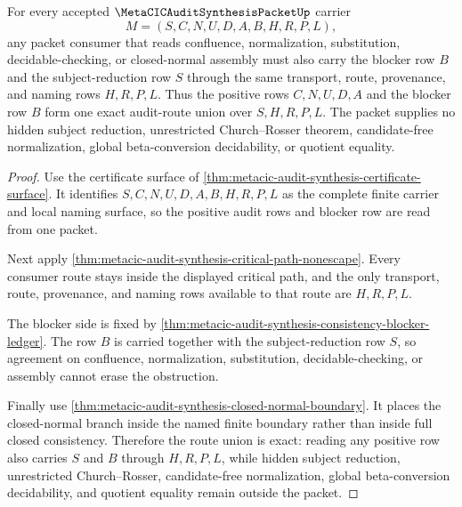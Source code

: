 \begin{theorem}
\label{thm:metacic-audit-synthesis-route-union-exactness}
For every accepted $\MetaCICAuditSynthesisPacketUp$ carrier
$$
M=(S,C,N,U,D,A,B,H,R,P,L),
$$
any packet consumer that reads confluence, normalization, substitution, decidable-checking, or closed-normal assembly must also carry the blocker row $B$ and the subject-reduction row $S$ through the same transport, route, provenance, and naming rows $H,R,P,L$. Thus the positive rows $C,N,U,D,A$ and the blocker row $B$ form one exact audit-route union over $S,H,R,P,L$. The packet supplies no hidden subject reduction, unrestricted Church--Rosser theorem, candidate-free normalization, global beta-conversion decidability, or quotient equality.
\end{theorem}
\begin{proof}
Use the certificate surface of \autoref{thm:metacic-audit-synthesis-certificate-surface}. It identifies $S,C,N,U,D,A,B,H,R,P,L$ as the complete finite carrier and local naming surface, so the positive audit rows and blocker row are read from one packet.

Next apply \autoref{thm:metacic-audit-synthesis-critical-path-nonescape}. Every consumer route stays inside the displayed critical path, and the only transport, route, provenance, and naming rows available to that route are $H,R,P,L$.

The blocker side is fixed by \autoref{thm:metacic-audit-synthesis-consistency-blocker-ledger}. The row $B$ is carried together with the subject-reduction row $S$, so agreement on confluence, normalization, substitution, decidable-checking, or assembly cannot erase the obstruction.

Finally use \autoref{thm:metacic-audit-synthesis-closed-normal-boundary}. It places the closed-normal branch inside the named finite boundary rather than inside full closed consistency. Therefore the route union is exact: reading any positive row also carries $S$ and $B$ through $H,R,P,L$, while hidden subject reduction, unrestricted Church--Rosser, candidate-free normalization, global beta-conversion decidability, and quotient equality remain outside the packet.
\end{proof}


